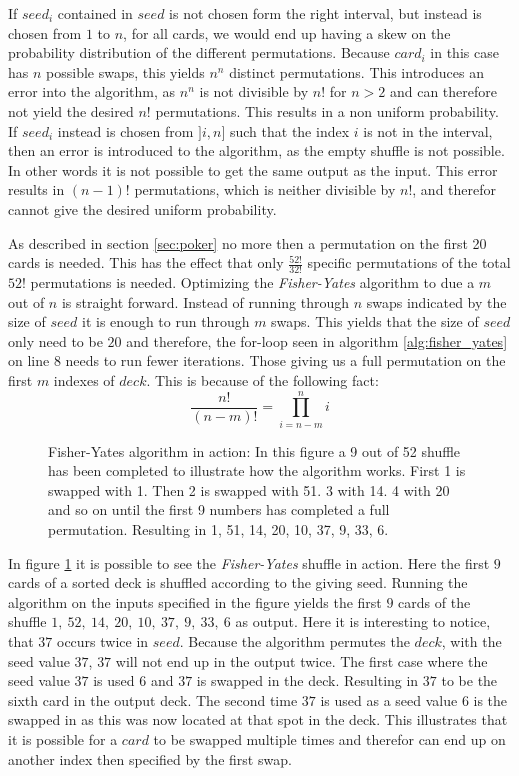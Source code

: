 \documentclass[twoside,11pt,openright]{report}
\newcommand{\FY}{\textit{Fisher-Yates} }
\begin{document}
If $seed_i$ contained in $seed$ is not chosen form the right interval, but instead is chosen from $1$ to $n$, for all cards, we would end up having a skew on the probability distribution of the different permutations. Because $card_i$ in this case has $n$ possible swaps, this yields $n^n$ distinct permutations. This introduces an error into the algorithm, as $n^n$ is not divisible by $n!$ for $n>2$ and can therefore not yield the desired $n!$ permutations. This results in a non uniform probability. If $seed_i$ instead is chosen from $]i,n]$ such that the index $i$ is not in the interval, then an error is introduced to the algorithm, as the empty shuffle is not possible. In other words it is not possible to get the same output as the input. This error results in $(n-1)!$ permutations, which is neither divisible by $n!$, and therefor cannot give the desired uniform probability.

\bigskip

As described in section \ref{sec:poker} no more then a permutation on the first 20 cards is needed. This has the effect that only $\frac{52!}{32!}$ specific permutations of the total $52!$ permutations is needed. Optimizing the \FY algorithm to due a $m$ out of $n$ is straight forward. Instead of running through $n$ swaps indicated by the size of $seed$ it is enough to run through $m$ swaps. This yields that the size of $seed$ only need to be $20$ and therefore, the for-loop seen in algorithm \ref{alg:fisher_yates} on line $8$ needs to run fewer iterations. Those giving us a full permutation on the first $m$ indexes of $deck$. This is because of the following fact: $$\frac{n!}{(n-m)!} = \prod_{i=n-m}^n i$$

\bigskip

\begin{figure}[t]
\centering
\scalebox{1.5}{}
\caption{Fisher-Yates algorithm in action: In this figure a 9 out of 52 shuffle has been completed to illustrate how the algorithm works. First 1 is swapped with 1. Then 2 is swapped with 51. 3 with 14. 4 with 20 and so on until the first 9 numbers has completed a full permutation. Resulting in 1, 51, 14, 20, 10, 37, 9, 33, 6.}
\label{fig:fisher_yates}
\end{figure}

In figure \ref{fig:fisher_yates} it is possible to see the \FY shuffle in action. Here the first $9$ cards of a sorted deck is shuffled according to the giving seed. Running the algorithm on the inputs specified in the figure yields the first $9$ cards of the shuffle $1,~52,~14,~20,~10,~37,~9,~33,~6$ as output. Here it is interesting to notice, that $37$ occurs twice in $seed$. Because the algorithm permutes the $deck$, with the seed value $37$, $37$ will not end up in the output twice. The first case where the seed value $37$ is used $6$ and $37$ is swapped in the deck. Resulting in $37$ to be the sixth card in the output deck. The second time $37$ is used as a seed value $6$ is the swapped in as this was now located at that spot in the deck. This illustrates that it is possible for a $card$ to be swapped multiple times and therefor can end up on another index then specified by the first swap.
\end{document}
